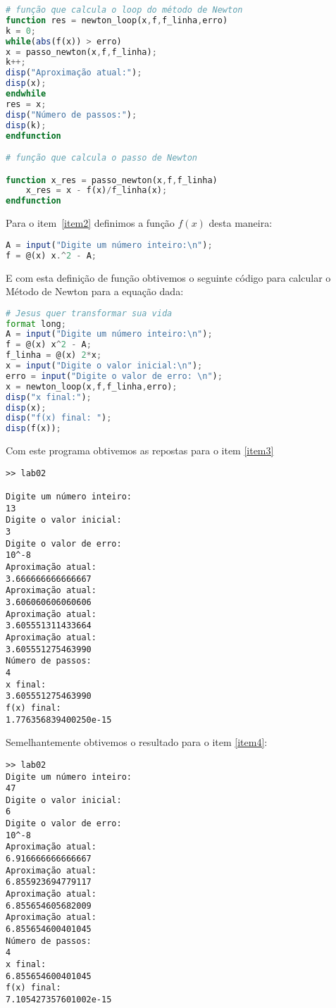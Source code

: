 \documentclass[a4paper]{article}
\begin{document}
\begin{lstlisting}[language = octave]
# função que calcula o loop do método de Newton
function res = newton_loop(x,f,f_linha,erro)
k = 0;
while(abs(f(x)) > erro)
x = passo_newton(x,f,f_linha);
k++;
disp("Aproximação atual:");
disp(x);
endwhile
res = x;
disp("Número de passos:");
disp(k);
endfunction

# função que calcula o passo de Newton

function x_res = passo_newton(x,f,f_linha)
	x_res = x - f(x)/f_linha(x);
endfunction
\end{lstlisting}
Para o item~\ref{item2} definimos a função $f(x)$ desta maneira:
\begin{lstlisting}[language = octave]
A = input("Digite um número inteiro:\n");
f = @(x) x.^2 - A;
\end{lstlisting}

E com esta definição de função obtivemos o seguinte código para calcular o Método de Newton para a equação dada:
\begin{lstlisting}[language = octave]
# Jesus quer transformar sua vida
format long;
A = input("Digite um número inteiro:\n");
f = @(x) x^2 - A;
f_linha = @(x) 2*x;
x = input("Digite o valor inicial:\n");
erro = input("Digite o valor de erro: \n"); 
x = newton_loop(x,f,f_linha,erro);
disp("x final:");
disp(x);
disp("f(x) final: ");
disp(f(x));
\end{lstlisting}

Com este programa obtivemos as repostas para o item \ref{item3}
\begin{lstlisting}
>> lab02

Digite um número inteiro:
13
Digite o valor inicial:
3
Digite o valor de erro:
10^-8
Aproximação atual:
3.666666666666667
Aproximação atual:
3.606060606060606
Aproximação atual:
3.605551311433664
Aproximação atual:
3.605551275463990
Número de passos:
4
x final:
3.605551275463990
f(x) final:
1.776356839400250e-15
\end{lstlisting}

Semelhantemente obtivemos o resultado para o item \ref{item4}:
\begin{lstlisting}
>> lab02
Digite um número inteiro:
47
Digite o valor inicial:
6
Digite o valor de erro:
10^-8
Aproximação atual:
6.916666666666667
Aproximação atual:
6.855923694779117
Aproximação atual:
6.855654605682009
Aproximação atual:
6.855654600401045
Número de passos:
4
x final:
6.855654600401045
f(x) final:
7.105427357601002e-15
\end{lstlisting}
\end{document}
